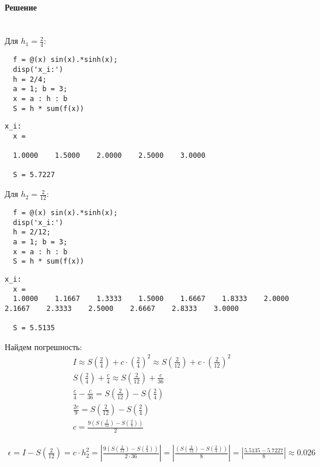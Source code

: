 \paragraph{Решение} ~\\
Для $h_{1}= \frac{2}{4}$:
\begin{lstlisting}
  f = @(x) sin(x).*sinh(x);
  disp('x_i:')
  h = 2/4;
  a = 1; b = 3;
  x = a : h : b
  S = h * sum(f(x))
\end{lstlisting}
\begin{lstlisting}[backgroundcolor=\color{cyan}]
  x_i:
  x =

  1.0000    1.5000    2.0000    2.5000    3.0000

  S = 5.7227
\end{lstlisting}
Для $h_{2} = \frac{2}{12}$:
\begin{lstlisting}
  f = @(x) sin(x).*sinh(x);
  disp('x_i:')
  h = 2/12;
  a = 1; b = 3;
  x = a : h : b
  S = h * sum(f(x))
\end{lstlisting}
\begin{lstlisting}[backgroundcolor=\color{cyan}]
  x_i:
  x =
  1.0000    1.1667    1.3333    1.5000    1.6667    1.8333    2.0000    2.1667    2.3333    2.5000    2.6667    2.8333    3.0000

  S = 5.5135
\end{lstlisting}

Найдем погрешность:
\begin{gather*}
  I \approx S\left(\frac{2}{4}\right) + c \cdot \left(\frac{2}{4}\right)^{2} \approx S\left(\frac{2}{12}\right) + c \cdot \left(\frac{2}{12}\right)^{2}\\[2mm]
  S\left(\frac{2}{4}\right) + \frac{c}{4} \approx S\left(\frac{2}{12}\right) + \frac{c}{36}\\[2mm]
  \frac{c}{4} - \frac{c}{36} = S\left(\frac{2}{12}\right) - S\left(\frac{2}{4}\right)\\[2mm]
  \frac{2c}{9} = S\left(\frac{2}{12}\right) - S\left(\frac{2}{4}\right)\\[2mm]
  c = \frac{9 \left(S\left(\frac{2}{12}\right) - S\left(\frac{2}{4}\right)\right)}{2}
\end{gather*}

\begin{align*}
  \epsilon = I - S\left(\frac{2}{12}\right) = c \cdot h_{2}^{2} = \left| \frac{9 \left(S\left(\frac{2}{12}\right) - S\left(\frac{2}{4}\right)\right)}{2 \cdot 36} \right| = \left| \frac{\left(S\left(\frac{2}{12}\right) - S\left(\frac{2}{4}\right)\right)}{8} \right| = \left|\frac{5.5135 - 5.7227}{8} \right| \approx 0.026
\end{align*}


